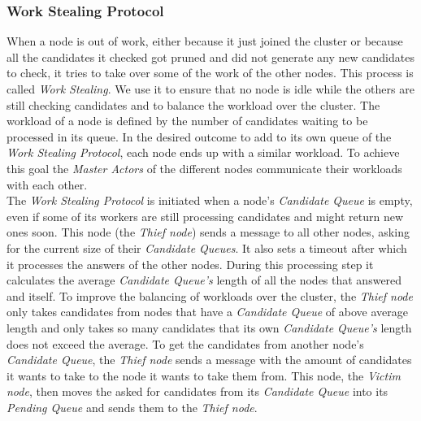 \subsubsection{Work Stealing Protocol} \label{protocol:workStealing}
When a node is out of work, either because it just joined the cluster or because all the candidates it checked got pruned and did not generate any new candidates to check, it tries to take over some of the work of the other nodes. 
This process is called \emph{Work Stealing}.
We use it to ensure that no node is idle while the others are still checking candidates and to balance the workload over the cluster. 
The workload of a node is defined by the number of candidates waiting to be processed in its queue. 
In the desired outcome to add to its own queue of the \emph{Work Stealing Protocol}, each node ends up with a similar workload. 
To achieve this goal the \emph{Master Actors} of the different nodes communicate their workloads with each other.\\
The \emph{Work Stealing Protocol} is initiated when a node's \emph{Candidate Queue} is empty, even if some of its workers are still processing candidates and might return new ones soon.
This node (the \emph{Thief node}) sends a message to all other nodes, asking for the current size of their \emph{Candidate Queues}.
It also sets a timeout after which it processes the answers of the other nodes. 
During this processing step it calculates the average \emph{Candidate Queue's} length of all the nodes that answered and itself.
To improve the balancing of workloads over the cluster, the \emph{Thief node} only takes candidates from nodes that have a \emph{Candidate Queue} of above average length and only takes so many candidates that its own \emph{Candidate Queue's} length does not exceed the average. 
To get the candidates from another node's \emph{Candidate Queue}, the \emph{Thief node} sends a message with the amount of candidates it wants to take to the node it wants to take them from.
This node, the \emph{Victim node}, then moves the asked for candidates from its \emph{Candidate Queue} into its \emph{Pending Queue} and sends them to the \emph{Thief node}.
